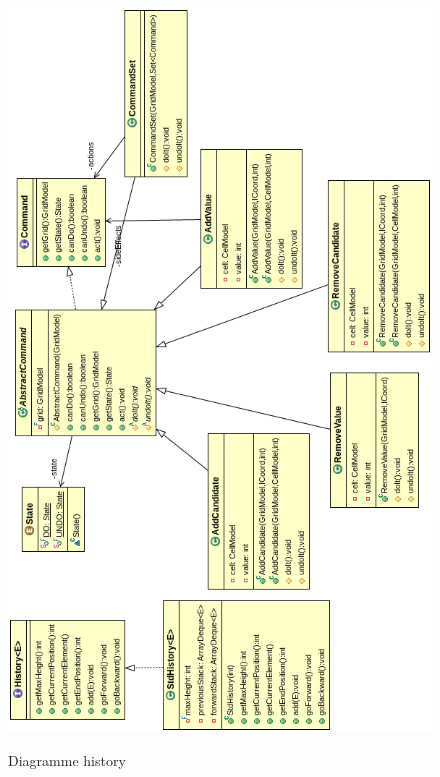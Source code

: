 \begin{figure}[ht]
  \caption{\label{annexe8} Diagramme history}
  \includegraphics [width=140mm]{images/history.png} \\[0.5cm]
\end{figure}


